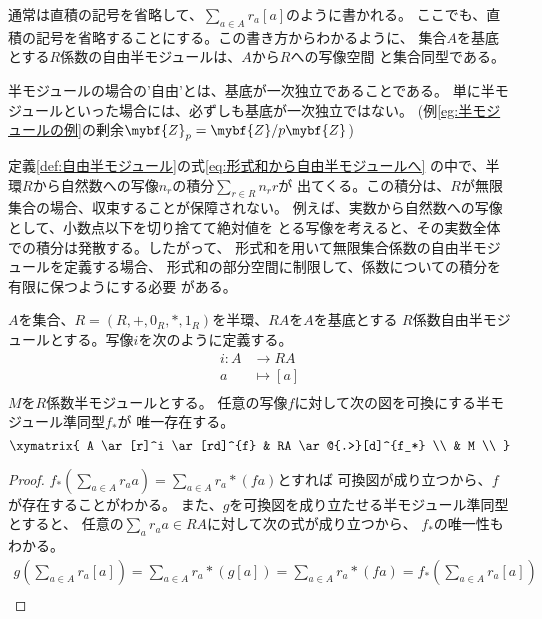 	通常は直積の記号を省略して、$\sum_{a\in A}r_a[a]$のように書かれる。
	ここでも、直積の記号を省略することにする。この書き方からわかるように、
	集合$A$を基底とする$R$係数の自由半モジュールは、$A$から$R$への写像空間
	と集合同型である。

	半モジュールの場合の'自由'とは、基底が一次独立であることである。
	単に半モジュールといった場合には、必ずしも基底が一次独立ではない。
	(例\ref{eg:半モジュールの例}の剰余$\mybf{Z}_p=\mybf{Z}/p\mybf{Z}$)

	定義\ref{def:自由半モジュール}の式\eqref{eq:形式和から自由半モジュールへ}
	の中で、半環$R$から自然数への写像$n_r$の積分$\sum_{r\in R}n_{r}r$が
	出てくる。この積分は、$R$が無限集合の場合、収束することが保障されない。
	例えば、実数から自然数への写像として、小数点以下を切り捨てて絶対値を
	とる写像を考えると、その実数全体での積分は発散する。したがって、
	形式和を用いて無限集合係数の自由半モジュールを定義する場合、
	形式和の部分空間に制限して、係数についての積分を有限に保つようにする必要
	がある。

	\begin{proposition}[自由半モジュールの普遍性]\label{prop:自由半モジュールの普遍性} %
		$A$を集合、$R=(R,+,0_R,*,1_R)$を半環、$RA$を$A$を基底とする
		$R$係数自由半モジュールとする。写像$i$を次のように定義する。
		\begin{equation}\begin{split} %
			i: A &\to RA \\
				a &\mapsto [a] \\
		\end{split}\end{equation} %
		$M$を$R$係数半モジュールとする。
		任意の写像$f$に対して次の図を可換にする半モジュール準同型$f_*$が
		唯一存在する。
		\begin{equation}\xymatrix{
			A \ar[r]^i \ar[rd]^{f} & RA \ar@{.>}[d]^{f_*} \\
			& M \\
		}\end{equation}
	\end{proposition} %
	\begin{proof} %
		$f_*(\sum_{a\in A}r_aa)=\sum_{a\in A}r_a*(fa)$とすれば
		可換図が成り立つから、$f$が存在することがわかる。
		また、$g$を可換図を成り立たせる半モジュール準同型とすると、
		任意の$\sum_{a}r_aa\in RA$に対して次の式が成り立つから、
		$f_*$の唯一性もわかる。
		\begin{equation*}\begin{split} %
			g(\sum_{a\in A}r_a[a]) 
				= \sum_{a\in A}r_a*(g[a]) = \sum_{a\in A}r_a*(fa)
				= f_*(\sum_{a\in A}r_a[a]) \\
		\end{split}\end{equation*} %
	\end{proof} %

